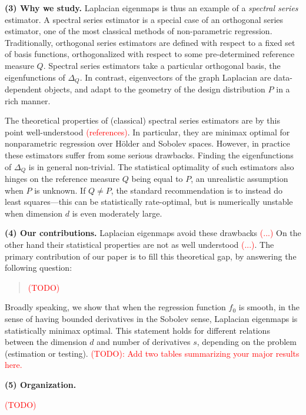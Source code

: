 \documentclass{article}
\newcommand{\1}{\mathbf{1}}
\theoremstyle{alden}
\theoremstyle{aldenthm}
\theoremstyle{definition}
\theoremstyle{remark}
\begin{document}
\textbf{(3) Why we study.} Laplacian eigenmaps is thus an example of a \emph{spectral series} estimator. A spectral series estimator is a special case of an orthogonal series estimator, one of the most classical methods of non-parametric regression. Traditionally, orthogonal series estimators are defined with respect to a fixed set of basis functions, orthogonalized with respect to some pre-determined reference measure $Q$. Spectral series estimators take a particular orthogonal basis, the eigenfunctions of $\Delta_Q$. In contrast, eigenvectors of the graph Laplacian are data-dependent objects, and adapt to the geometry of the design distribution $P$ in a rich manner. 

The theoretical properties of (classical) spectral series estimators are by this point well-understood \textcolor{red}{(references)}. In particular, they are minimax optimal for nonparametric regression over H\"{o}lder and Sobolev spaces. However, in practice these estimators suffer from some serious drawbacks. Finding the eigenfunctions of $\Delta_Q$ is in general non-trivial. The statistical optimality of such estimators also hinges on the reference measure $Q$ being equal to $P$, an unrealistic assumption when $P$ is unknown. If $Q \neq P$, the standard recommendation is to instead do least squares---this can be statistically rate-optimal, but is numerically unstable when dimension $d$ is even moderately large.

\textbf{(4) Our contributions.} Laplacian eigenmaps avoid these drawbacks \textcolor{red}{(...)} On the other hand their statistical properties are not as well understood \textcolor{red}{(...)}. The primary contribution of our paper is to fill this theoretical gap, by answering the following question:

\begin{quote}
	\textcolor{red}{(TODO)}
\end{quote}

Broadly speaking, we show that when the regression function $f_0$ is smooth, in the sense of having bounded derivatives in the Sobolev sense, Laplacian eigenmaps is statistically minimax optimal. This statement holds for different relations between the dimension $d$ and number of derivatives $s$, depending on the problem (estimation or testing). \textcolor{red}{(TODO): Add two tables summarizing your major results here.} 

\textbf{(5) Organization.}

\textcolor{red}{(TODO)}
\end{document}

